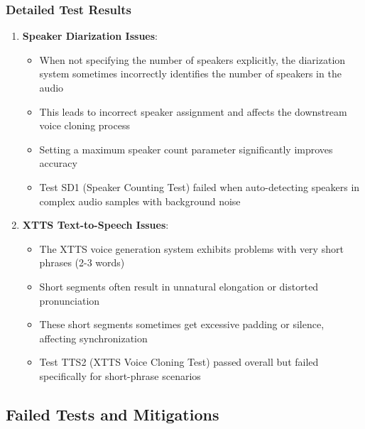 \documentclass[11pt,a4paper]{article}
\begin{document}
\subsubsection{Detailed Test Results}

\begin{enumerate}
    \item \textbf{Speaker Diarization Issues}: 
    \begin{itemize}
        \item When not specifying the number of speakers explicitly, the diarization system sometimes incorrectly identifies the number of speakers in the audio
        \item This leads to incorrect speaker assignment and affects the downstream voice cloning process
        \item Setting a maximum speaker count parameter significantly improves accuracy
        \item Test SD1 (Speaker Counting Test) failed when auto-detecting speakers in complex audio samples with background noise
    \end{itemize}
    
    \item \textbf{XTTS Text-to-Speech Issues}: 
    \begin{itemize}
        \item The XTTS voice generation system exhibits problems with very short phrases (2-3 words)
        \item Short segments often result in unnatural elongation or distorted pronunciation
        \item These short segments sometimes get excessive padding or silence, affecting synchronization
        \item Test TTS2 (XTTS Voice Cloning Test) passed overall but failed specifically for short-phrase scenarios
    \end{itemize}
\end{enumerate}

\subsection{Failed Tests and Mitigations}
\end{document}
